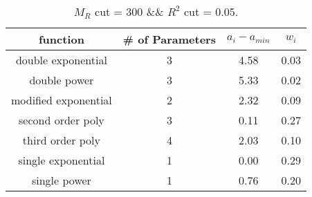  
\begin{table}[H] 
\begin{center} 
\begin{tabular}{|c|c|c|c|} 
\hline function & \# of Parameters & $a_i-a_{min}$ & $w_i$ \\ \hline 
double exponential &  3 &   4.58 &   0.03 \\ 
double power &  3 &   5.33 &   0.02 \\ 
modified exponential &  2 &   2.32 &   0.09 \\ 
second order poly &  3 &   0.11 &   0.27 \\ 
third order poly &  4 &   2.03 &   0.10 \\ 
single exponential &  1 &   0.00 &   0.29 \\ 
single power &  1 &   0.76 &   0.20 \\ 
\hline 
\end{tabular} 
\caption{$M_R$ cut = 300 \&\& $R^2$ cut = 0.05.} 
\label{tab:FitChoices_300_0.05} 
\end{center} 
\end{table} 
 
 
